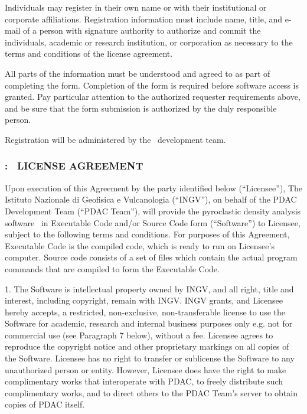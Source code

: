 Individuals may register in their own name or with their institutional or
corporate affiliations. Registration information must include name, title, 
and e-mail of a person with signature authority to authorize and commit the
individuals, academic or research institution, or corporation as necessary 
to the terms and conditions of the license agreement.

All parts of the information must be understood and agreed to as part of
completing the form. Completion of the form is required before software 
access is granted. Pay particular attention to the authorized requester 
requirements above, and be sure that the form submission is authorized 
by the duly responsible person.

Registration will be administered by the \PDAC\ development team.

\newpage
\subsubsection*{\PDAC: \PDACNAME\ LICENSE AGREEMENT}

Upon execution of this Agreement by the party identified below (``Licensee''),
The Istituto Nazionale di Geofisica e Vulcanologia (``INGV''), on 
behalf of the PDAC Development Team (``PDAC Team''),
will provide the pyroclastic density analysis software \PDAC\ in Executable 
Code and/or Source Code form (``Software'') to Licensee, subject to 
the following terms and conditions. For purposes of this Agreement, 
Executable Code is the compiled code, which is ready to run on Licensee's 
computer. Source code consists of a set of files which contain the 
actual program commands that are compiled to form the Executable Code.

1. The Software is intellectual property owned by INGV, and all 
right, title and interest, including copyright, remain with INGV. 
INGV grants, and Licensee hereby accepts, a restricted, non-exclusive, 
non-transferable license to use the Software for academic, research 
and internal business purposes only e.g. not for commercial use 
(see Paragraph 7 below), without a fee. Licensee agrees to reproduce 
the copyright notice and other proprietary markings on all copies of 
the Software. Licensee has no right to transfer or sublicense the 
Software to any unauthorized person or entity. However, Licensee does 
have the right to make complimentary works that interoperate with PDAC, 
to freely distribute such complimentary works, and to direct others 
to the PDAC Team's server to obtain copies of PDAC itself.

